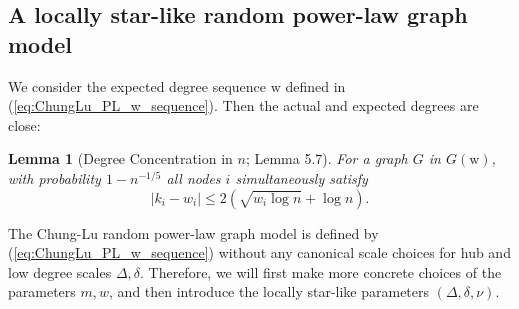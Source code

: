 \documentclass[a4paper]{article}
\theoremstyle{plain}
\newtheorem{lemma}[theorem]{Lemma}
\theoremstyle{definition}
\newcommand{\brw}{\boldsymbol{\mathrm{w}}}
\begin{document}
\subsection{A locally star-like random power-law graph model} \label{sec:eg_loca_star_network}

We consider the expected degree sequence $\brw$ defined in (\ref{eq:ChungLu_PL_w_sequence}). %
Then the actual and expected degrees are close:
\begin{lemma}[Degree Concentration in $n$; \cite{Chung_2006} Lemma 5.7] \label{thm:CLlemma5.7}
	For a graph $G$ in $G(\brw)$, with probability $1-n^{-1/5}$ all nodes $i$ simultaneously satisfy
	$$|k_i- w_i| \leq 2 (\sqrt{w_i \log n} + \log n).$$
\end{lemma}






The Chung-Lu random power-law graph model %
is defined by (\ref{eq:ChungLu_PL_w_sequence}) without any canonical scale choices for hub and low degree scales $\Delta,\delta$. Therefore, we will first make more concrete choices of the parameters $m,w$, and then introduce the locally star-like parameters $(\Delta,\delta,\nu)$. %
\end{document}
